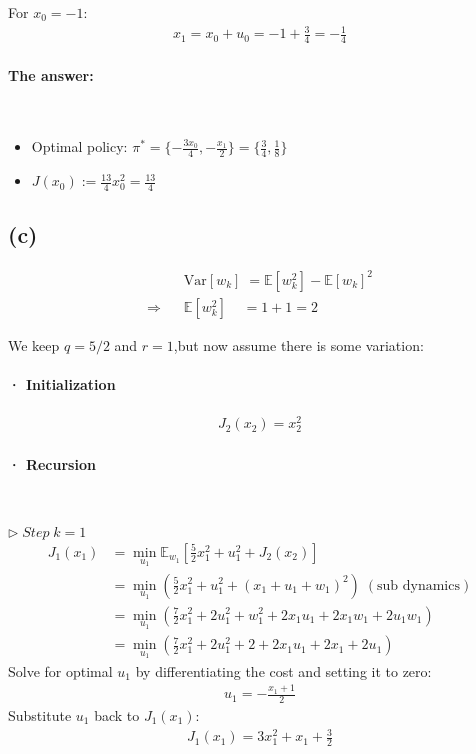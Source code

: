 \documentclass[8pt, a4paper, oneside, justified]{article}
\numberwithin{equation}{section}
\begin{document}
For $x_0 = -1$:
\begin{align}
    x_1 = x_0 + u_0 = -1 + \frac{3}{4} = -\frac{1}{4}
\end{align}

\paragraph*{The answer:}~{}

\begin{itemize}
    \item Optimal policy:
    $\pi^* = \{-\frac{3x_0}{4}, -\frac{x_1}{2}\} = \{\frac{3}{4}, \frac{1}{8}\}$
    \item $J(x_0):=\frac{13}{4}x_0^2 = \frac{13}{4}$
    
\end{itemize}

\subsection*{(c)}

\begin{align}
    & \text{Var} [w_k] \;= \mathbb{E}[w_k^2]-\mathbb{E}[w_k]^2 \\
    \Rightarrow\;\;\; & \mathbb{E}[w_k^2] \;\;\;\;= 1+1=2
\end{align}

We keep $q = 5/2$ and $r = 1$,but now assume there is some variation:
\paragraph*{· Initialization}

\begin{align}
    J_2(x_2)=x_2^2
\end{align}

\paragraph*{· Recursion}~{}

$\rhd \;Step\;k=1$
\begin{align}
    J_1(x_1)& = \min_ {u_1} \mathbb{E}_{w_1}[\frac{5}{2}x_1^2+u_1^2+J_2(x_2)] \\
    & = \min_ {u_1}(\frac{5}{2}x_1^2+u_1^2+(x_1+u_1+w_1)^2)\;(\text{sub dynamics}) \\
    & = \min_ {u_1}(\frac{7}{2}x_1^2+2u_1^2+w_1^2+2x_1u_1+2x_1w_1+2u_1w_1) \\
    & = \min_ {u_1}(\frac{7}{2}x_1^2+2u_1^2+2+2x_1u_1+2x_1+2u_1)
\end{align}
\hspace{8pt} Solve for optimal $u_1$ by differentiating the cost and setting it to zero:
\begin{align}
    u_1=-\frac{x_1+1}{2}
\end{align}
\hspace{8pt} Substitute $u_1$ back to $J_1(x_1)$:
\begin{align}
    J_1(x_1)=3x_1^2+x_1+\frac{3}{2}
\end{align}
\end{document}
